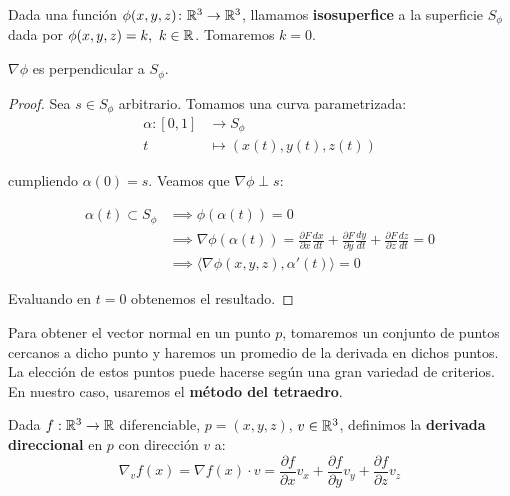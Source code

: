 \begin{definicion}
    Dada una función $\phi(x,y,z)\colon \mathbb{R}^3 \to \mathbb{R}^3$, llamamos \textbf{isosuperfice} a la superficie $S_\phi$ dada por $\phi(x,y,z)=k,\ k\in \mathbb{R}$. Tomaremos $k=0$.
\end{definicion}


\begin{proposicion}\label{p:gradient_perp}
    $\nabla\phi$ es perpendicular a $S_\phi$.
\end{proposicion}

\begin{proof}
    Sea $s\in S_\phi$ arbitrario. Tomamos una curva parametrizada:
    \begin{align*}
        \alpha \colon [0,1] & \to S_\phi                             \\
        t                   & \mapsto \left(x(t), y(t), z(t) \right)
    \end{align*}

    cumpliendo $\alpha(0)=s$. Veamos que $\nabla\phi \perp s$:

    \begin{align*}
        \alpha(t)\subset S_\phi & \implies \phi(\alpha(t))=0                                                                                                                                                      \\
                                & \implies \nabla\phi(\alpha(t)) = \frac{\partial{F}}{\partial{x}}\frac{dx}{dt} + \frac{\partial{F}}{\partial{y}}\frac{dy}{dt} + \frac{\partial{F}}{\partial{z}}\frac{dz}{dt} = 0 \\
                                & \implies \langle \nabla\phi(x,y,z), \alpha'(t)\rangle = 0
    \end{align*}

    Evaluando en $t=0$ obtenemos el resultado.
\end{proof}

Para obtener el vector normal en un punto $p$, tomaremos un conjunto de puntos cercanos a dicho punto y haremos un promedio de la derivada en dichos puntos. La elección de estos puntos puede hacerse según una gran variedad de criterios. En nuestro caso, usaremos el \textbf{método del tetraedro}.

\begin{definicion}
    Dada $f:\mathbb{R}^3\to \mathbb{R}$ diferenciable, $p = (x,y,z)$, $v\in \mathbb{R}^3$, definimos la \textbf{derivada direccional} en $p$ con dirección $v$ a:
    \begin{equation*}
        \nabla_v f(x) = \nabla f(x) \cdot v = \frac{\partial{f}}{\partial{x}}v_x + \frac{\partial{f}}{\partial{y}}v_y + \frac{\partial{f}}{\partial{z}}v_z
    \end{equation*}
\end{definicion}

